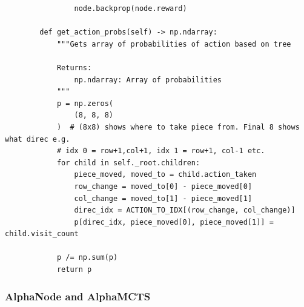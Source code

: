 \documentclass{article}
\begin{document}
\begin{verbatim}
                node.backprop(node.reward)

        def get_action_probs(self) -> np.ndarray:
            """Gets array of probabilities of action based on tree

            Returns:
                np.ndarray: Array of probabilities
            """
            p = np.zeros(
                (8, 8, 8)
            )  # (8x8) shows where to take piece from. Final 8 shows what direc e.g.
            # idx 0 = row+1,col+1, idx 1 = row+1, col-1 etc.
            for child in self._root.children:
                piece_moved, moved_to = child.action_taken
                row_change = moved_to[0] - piece_moved[0]
                col_change = moved_to[1] - piece_moved[1]
                direc_idx = ACTION_TO_IDX[(row_change, col_change)]
                p[direc_idx, piece_moved[0], piece_moved[1]] = child.visit_count

            p /= np.sum(p)
            return p
    \end{verbatim}

    \pagebreak
    
    \subsubsection{AlphaNode and AlphaMCTS}
    
\end{document}
